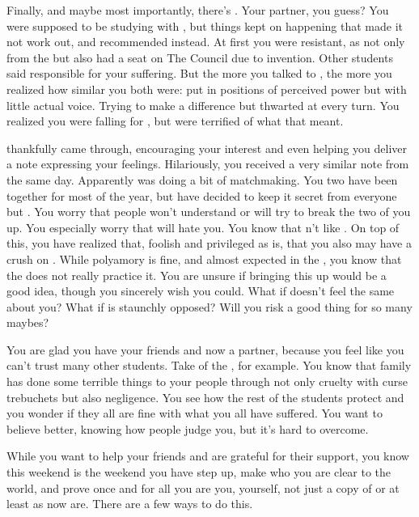 \documentclass[char]{GL2020}
\begin{document}
Finally, and maybe most importantly, there's \cTechStar{\full}. Your partner, you guess? You were supposed to be studying with \cInitiate{}, but things kept on happening that made it not work out, and \cInitiate{\they} recommended \cTechStar{} instead. At first you were resistant, as \cTechStar{\they} \cTechStar{\were} not only from the \pTech{} but also had a seat on The Council due to \cTechStar{\their} invention. Other \pShippie{} students said \cTechStar{\they} \cTechStar{\were} responsible for your suffering. But the more you talked to \cTechStar{\them}, the more you realized how similar you both were: put in positions of perceived power but with little actual voice. Trying to make a difference but thwarted at every turn. You realized you were falling for \cTechStar{\them}, but were terrified of what that meant.

\cInitiate{} thankfully came through, encouraging your interest and even helping you deliver a note expressing your feelings. Hilariously, you received a very similar note from \cTechStar{} the same day. Apparently \cInitiate{} was doing a bit of matchmaking. You two have been together for most of the year, but have decided to keep it secret from everyone but \cInitiate{}. You worry that people won’t understand or will try to break the two of you up. You especially worry that \cPirateChild{} will hate you. You know that \cPirateChild{\they} \cPirateChild{\do}n’t like \cTechStar{}. On top of this, you have realized that, foolish and privileged as \cInitiate{} is, that you also may have a crush on \cInitiate{\them}. While polyamory is fine, and almost expected in the \pShip{}, you know that the \pTech{} does not really practice it. You are unsure if bringing this up would be a good idea, though you sincerely wish you could. What if \cInitiate{} doesn’t feel the same about you? What if \cTechStar{} is staunchly opposed? Will you risk a good thing for so many maybes?

You are glad you have your friends and now a partner, because you feel like you can’t trust many other students. Take \cLibAssist{} of the \pFarm{}, for example. You know that \cLibAssist{\their} family has done some terrible things to your people through not only cruelty with curse trebuchets but also negligence. You see how the rest of the \pFarm{} students protect \cLibAssist{\them} and you wonder if they all are fine with what you all have suffered. You want to believe better, knowing how people judge you, but it's hard to overcome.

While you want to help your friends and are grateful for their support, you know this weekend is the weekend you have step up, make who you are clear to the world, and prove once and for all you are you, yourself, not just a copy of \cLoud{} or at least \cLoud{} as \cLoud{\they} now are.  There are a few ways to do this.  
\end{document}
